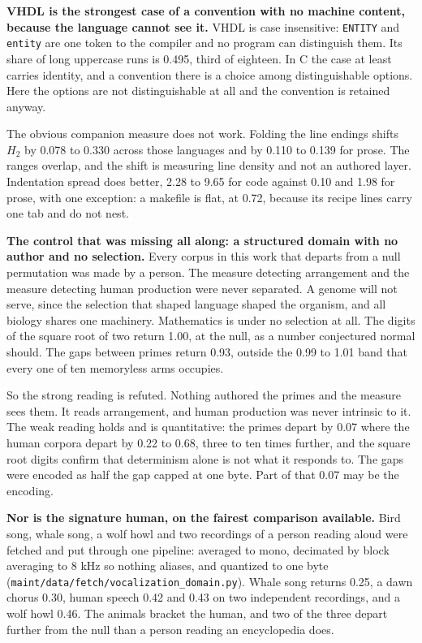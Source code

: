 \textbf{VHDL is the strongest case of a convention with no machine content, because the language cannot see it.} VHDL is case insensitive: \texttt{ENTITY} and \texttt{entity} are one token to the compiler and no program can distinguish them. Its share of long uppercase runs is 0.495, third of eighteen. In C the case at least carries identity, and a convention there is a choice among distinguishable options. Here the options are not distinguishable at all and the convention is retained anyway.

The obvious companion measure does not work. Folding the line endings shifts \(H_2\) by 0.078 to 0.330 across those languages and by 0.110 to 0.139 for prose. The ranges overlap, and the shift is measuring line density and not an authored layer. Indentation spread does better, 2.28 to 9.65 for code against 0.10 and 1.98 for prose, with one exception: a makefile is flat, at 0.72, because its recipe lines carry one tab and do not nest.

\textbf{The control that was missing all along: a structured domain with no author and no selection.} Every corpus in this work that departs from a null permutation was made by a person. The measure detecting arrangement and the measure detecting human production were never separated. A genome will not serve, since the selection that shaped language shaped the organism, and all biology shares one machinery. Mathematics is under no selection at all. The digits of the square root of two return 1.00, at the null, as a number conjectured normal should. The gaps between primes return 0.93, outside the 0.99 to 1.01 band that every one of ten memoryless arms occupies.

So the strong reading is refuted. Nothing authored the primes and the measure sees them. It reads arrangement, and human production was never intrinsic to it. The weak reading holds and is quantitative: the primes depart by 0.07 where the human corpora depart by 0.22 to 0.68, three to ten times further, and the square root digits confirm that determinism alone is not what it responds to. The gaps were encoded as half the gap capped at one byte. Part of that 0.07 may be the encoding.

\textbf{Nor is the signature human, on the fairest comparison available.} Bird song, whale song, a wolf howl and two recordings of a person reading aloud were fetched and put through one pipeline: averaged to mono, decimated by block averaging to 8 kHz so nothing aliases, and quantized to one byte (\texttt{maint/\allowbreak{}data/\allowbreak{}fetch/\allowbreak{}vocalization\_\allowbreak{}domain.\allowbreak{}py}). Whale song returns 0.25, a dawn chorus 0.30, human speech 0.42 and 0.43 on two independent recordings, and a wolf howl 0.46. The animals bracket the human, and two of the three depart further from the null than a person reading an encyclopedia does.

